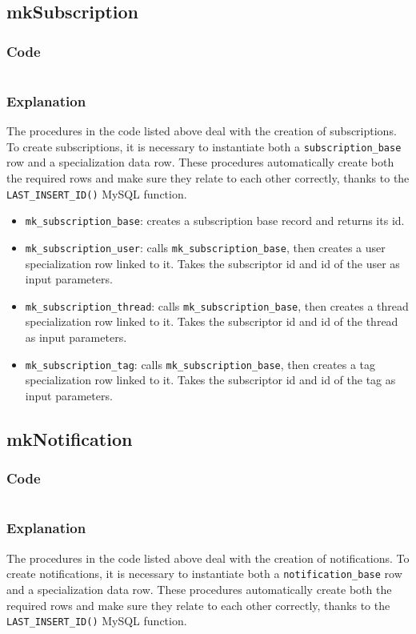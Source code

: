 \documentclass[12pt]{report}
\newcommand{\printSQLtest}[1]
{
    \inputminted[linenos, breaklines, breakbytoken, tabsize=4, fontsize=\footnotesize]{mysql}{#1}
}
\newcommand{\printSQLTablepage}[2]
{    
    \subsection{#2}
    \subsubsection{Code}
    \printSQLtest{../sql/parts/#1}
    \subsubsection{Explanation}
}
\begin{document}
                \newpage

                \printSQLTablepage{22_procsMkSubscription.sql}{mkSubscription}
                    The procedures in the code listed above deal with the creation of subscriptions. To create subscriptions, it is necessary to instantiate both a \texttt{subscription_base} row and a specialization data row.
                    These procedures automatically create both the required rows and make sure they relate to each other correctly, thanks to the \texttt{LAST_INSERT_ID()} MySQL function.

                    \begin{itemize}
                        \item \texttt{mk_subscription_base}: creates a subscription base record and returns its id.
                         \item \texttt{mk_subscription_user}: calls \texttt{mk_subscription_base}, then creates a user specialization row linked to it.
                        Takes the subscriptor id and id of the user as input parameters.
                        \item \texttt{mk_subscription_thread}: calls \texttt{mk_subscription_base}, then creates a thread specialization row linked to it.
                        Takes the subscriptor id and id of the thread as input parameters.
                        \item \texttt{mk_subscription_tag}: calls \texttt{mk_subscription_base}, then creates a tag specialization row linked to it.
                        Takes the subscriptor id and id of the tag as input parameters.
                    \end{itemize}

                \newpage

                \printSQLTablepage{23_procsMkNotification.sql}{mkNotification}
                     The procedures in the code listed above deal with the creation of notifications. To create notifications, it is necessary to instantiate both a \texttt{notification_base} row and a specialization data row.
                    These procedures automatically create both the required rows and make sure they relate to each other correctly, thanks to the \texttt{LAST_INSERT_ID()} MySQL function.
\end{document}
